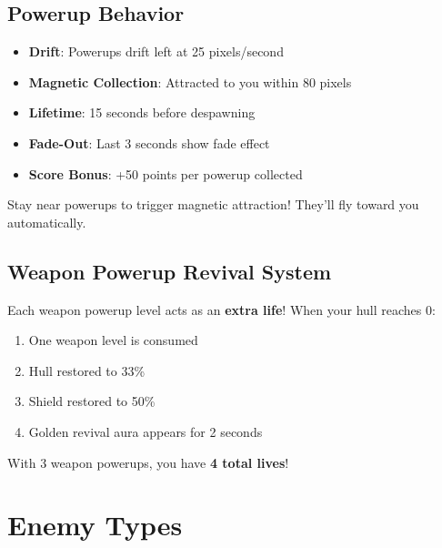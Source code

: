 \documentclass[11pt,a4paper]{article}
\begin{document}
\subsection{Powerup Behavior}

\begin{itemize}[leftmargin=*]
    \item \textbf{Drift}: Powerups drift left at 25 pixels/second
    \item \textbf{Magnetic Collection}: Attracted to you within 80 pixels
    \item \textbf{Lifetime}: 15 seconds before despawning
    \item \textbf{Fade-Out}: Last 3 seconds show fade effect
    \item \textbf{Score Bonus}: +50 points per powerup collected
\end{itemize}

\begin{tcolorbox}[colback=successcolor!10, colframe=successcolor, title=\faCheck~Collection Tip]
Stay near powerups to trigger magnetic attraction! They'll fly toward you automatically.
\end{tcolorbox}

\subsection{Weapon Powerup Revival System}

\begin{tcolorbox}[colback=infocolor!10, colframe=infocolor, title=\faLightbulb~Extra Lives!]
Each weapon powerup level acts as an \textbf{extra life}! When your hull reaches 0:
\begin{enumerate}[nosep]
    \item One weapon level is consumed
    \item Hull restored to 33\%
    \item Shield restored to 50\%
    \item Golden revival aura appears for 2 seconds
\end{enumerate}

With 3 weapon powerups, you have \textbf{4 total lives}!
\end{tcolorbox}

\section{Enemy Types}
\end{document}
